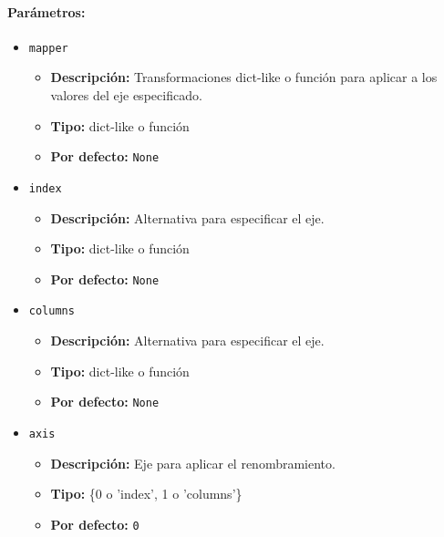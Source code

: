         \paragraph{Parámetros:}
        \begin{itemize}
            \item \texttt{mapper}
                \begin{itemize}
                    \item \textbf{Descripción:} Transformaciones dict-like o función para aplicar a los valores del eje especificado.
                    \item \textbf{Tipo:} dict-like o función
                    \item \textbf{Por defecto:} \texttt{None}
                \end{itemize}

            \item \texttt{index}
                \begin{itemize}
                    \item \textbf{Descripción:} Alternativa para especificar el eje.
                    \item \textbf{Tipo:} dict-like o función
                    \item \textbf{Por defecto:} \texttt{None}
                \end{itemize}

            \item \texttt{columns}
                \begin{itemize}
                    \item \textbf{Descripción:} Alternativa para especificar el eje.
                    \item \textbf{Tipo:} dict-like o función
                    \item \textbf{Por defecto:} \texttt{None}
                \end{itemize}

            \item \texttt{axis}
                \begin{itemize}
                    \item \textbf{Descripción:} Eje para aplicar el renombramiento.
                    \item \textbf{Tipo:} \{0 o 'index', 1 o 'columns'\}
                    \item \textbf{Por defecto:} \texttt{0}
                \end{itemize}


\end{itemize}
